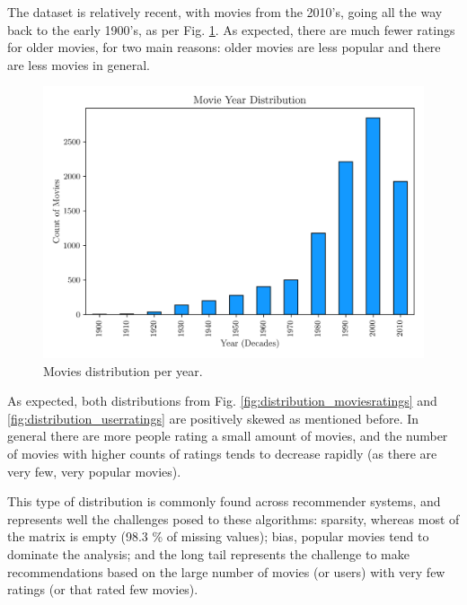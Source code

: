 \documentclass[conference]{IEEEtran}
\begin{document}
The dataset is relatively recent, with movies from the 2010's, going all the way back to the early 1900's, as per Fig. \ref{fig:year_distribution}. As expected, there are much fewer ratings for older movies, for two main reasons: older movies are less popular and there are less movies in general.

\begin{figure}[H]
    \centering
    \includegraphics[width=1\linewidth]{assets/year_distribution.png}
    \caption{Movies distribution per year.}
    \label{fig:year_distribution}
\end{figure}

As expected, both distributions from Fig. \ref{fig:distribution_moviesratings} and \ref{fig:distribution_userratings} are positively skewed as mentioned before. In general there are more people rating a small amount of movies, and the number of movies with higher counts of ratings tends to decrease rapidly (as there are very few, very popular movies).


This type of distribution is commonly found across recommender systems, and represents well the challenges posed to these algorithms: sparsity, whereas most of the matrix is empty (98.3 \% of missing values); bias, popular movies tend to dominate the analysis; and the long tail represents the challenge to make recommendations based on the large number of movies (or users) with very few ratings (or that rated few movies).
\end{document}
